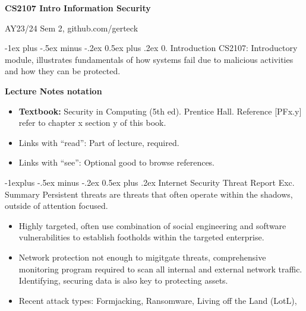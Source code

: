 \documentclass[10pt, landscape]{article}
\makeatletter
\renewcommand{\section}{\@startsection{section}{1}{0mm}%
                                {-1ex plus -.5ex minus -.2ex}%
                                {0.5ex plus .2ex}%
                                {\normalfont\large\bfseries}}
\renewcommand{\subsection}{\@startsection{subsection}{2}{0mm}%
                                {-1explus -.5ex minus -.2ex}%
                                {0.5ex plus .2ex}%
                                {\normalfont\normalsize\bfseries}}
\makeatother
\begin{document}
\raggedright
\footnotesize
\begin{multicols*}{3}

\setlength{\premulticols}{1pt}
\setlength{\postmulticols}{1pt}
\setlength{\multicolsep}{1pt}
\setlength{\columnsep}{2pt}

\begin{center}
     \Large{\textbf{CS2107 Intro Information Security}} \\
\end{center}
AY23/24 Sem 2, github.com/gerteck


\section{0. Introduction}
CS2107: Introductory module, illustrates fundamentals of how systems fail due to malicious activities and how they can be protected. 

\textbf{Lecture Notes notation}
\begin{itemize}
\item \textbf{Textbook:} Security in Computing (5th ed). Prentice Hall. Reference [PFx.y] refer to chapter x section y of this book.
\item Links with ``read'': Part of lecture, required. 
\item Links with ``see'': Optional good to browse references.
\end{itemize}

\subsection{Internet Security Threat Report Exc. Summary}
Persistent threats are threats that often operate within the shadows, outside of attention focused. 
\begin{itemize}
\item Highly targeted, often use combination of social engineering and software vulnerabilities to establish footholds within the targeted enterprise.
\item Network protection not enough to migitgate threats, comprehensive monitoring program required to scan all internal and external network traffic. Identifying, securing data is also key to protecting assets.
\item Recent attack types: Formjacking, Ransomware, Living off the Land (LotL), 
\end{itemize}



\end{multicols*}
\end{document}
